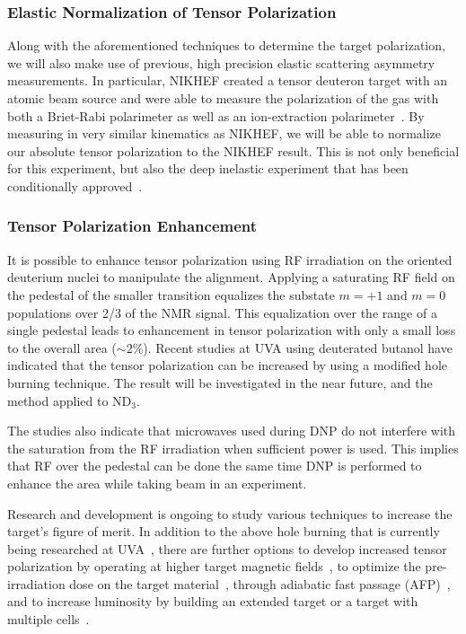 \subsubsection{Elastic Normalization of Tensor Polarization}

Along with the aforementioned techniques to determine the target polarization, we will also make use of 
previous, high precision elastic scattering asymmetry measurements.  In particular, NIKHEF created a 
tensor deuteron target with an atomic beam source and were able to measure the polarization of the gas 
with both a Briet-Rabi polarimeter as well as an ion-extraction polarimeter~\cite{Zhou:1996gi,Bouwhuis:1998jj}.   
By measuring in very similar kinematics as NIKHEF, we will be able to normalize our absolute tensor polarization
to the NIKHEF result.   This is not only beneficial for this experiment, but also the deep inelastic experiment
that has been conditionally approved~\cite{b1prop}.

\subsubsection{Tensor Polarization Enhancement}
It is possible to enhance tensor polarization using RF irradiation on the oriented deuterium nuclei to manipulate the alignment.
Applying a saturating RF field on the pedestal of the smaller transition equalizes the substate $m=+1$ and $m=0$ populations
over 2/3 of the NMR signal.  This equalization over the range of a single pedestal leads to enhancement in tensor polarization with only a small loss
to the overall area ($\sim 2\%$).  Recent studies at UVA using deuterated butanol have indicated that the tensor polarization can be increased by using a modified hole burning technique. The result will be investigated in the near future, and the method applied to ND$_3$.

The studies also indicate that microwaves used during DNP do not
interfere with the saturation from the RF irradiation when sufficient power is used.  This implies that RF over the pedestal can be done the same time DNP is performed to enhance the area while taking beam in an experiment.  

Research and development is ongoing to study various techniques to increase the target's figure of merit. In addition to the above hole burning that is currently being researched at UVA~\cite{keller1, keller2, keller3,Keller:2015tn}, there are further options to develop increased tensor polarization by operating at higher target magnetic fields~\cite{CRABBLAB}, to optimize the pre-irradiation dose on the target material~\cite{Bueltmann:1998wq}, through adiabatic fast passage (AFP)~\cite{PhysRevB.46.6596}, and to increase luminosity by building an extended target or a target with multiple cells~\cite{Rondon-Aramayo:2014ida}.


